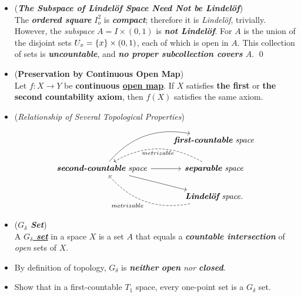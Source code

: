 \documentclass[11pt]{article}
\begin{document}
\begin{itemize}
\item \begin{example} (\emph{\textbf{The Subspace of Lindel{\"o}f Space Need Not be Lindel{\"o}f}})\\
The \emph{\textbf{ordered square}} $I_o^2$ is \emph{\textbf{compact}}; therefore it is \emph{Lindel{\"o}f}, trivially. However, the \emph{subspace} $A = I \times (0, 1)$ is \emph{\textbf{not Lindel{\"o}f}}. For $A$ is the union of the disjoint sets $U_x = \left\{x\right\} \times (0, 1)$, each of which is open in $A$. This collection of sets is \emph{\textbf{uncountable}}, and \emph{\textbf{no proper subcollection covers} $A$}. \qed
\end{example}

\item \begin{proposition} (\textbf{Preservation by Continuous Open Map}) \citep{munkres2000topology}\\
Let $f : X \rightarrow Y$ be \textbf{continuous \underline{open map}}. If $X$ satisfies \textbf{the first} or \textbf{the second countability axiom}, then $f(X)$ satisfies the same axiom.
\end{proposition}

\item \begin{remark} (\emph{Relationship of Several Topological Properties})
\[
  \begin{tikzcd}
     &  \text{\emph{\textbf{first-countable} space}} \\
   \text{\emph{\textbf{second-countable} space}}  \arrow[ur, bend left] \arrow{r}{} \arrow[dr]  & \arrow[l, bend right, dashed, "metrizable"] \text{\emph{\textbf{separable} space}}\\
     &  \arrow[ul, dashed,  bend left,  "metrizable"] \text{\emph{\textbf{Lindel{\"o}f} space}}.
  \end{tikzcd}
\] 
\end{remark}

\item \begin{definition} (\emph{\textbf{$G_{\delta}$ Set}})\\
A \underline{\emph{\textbf{$G_{\delta}$ set}}} in a space $X$ is a set $A$ that equals a \emph{\textbf{countable intersection}} of \emph{open} sets of $X$.
\end{definition}

\item \begin{remark}
By definition of topology, $G_{\delta}$ is \emph{\textbf{neither} \textbf{open} nor \textbf{closed}}.
\end{remark}

\item \begin{exercise}
Show that in a first-countable $T_1$ space, every one-point set is a $G_{\delta}$ set.
\end{exercise}
\end{itemize}
\end{document}
